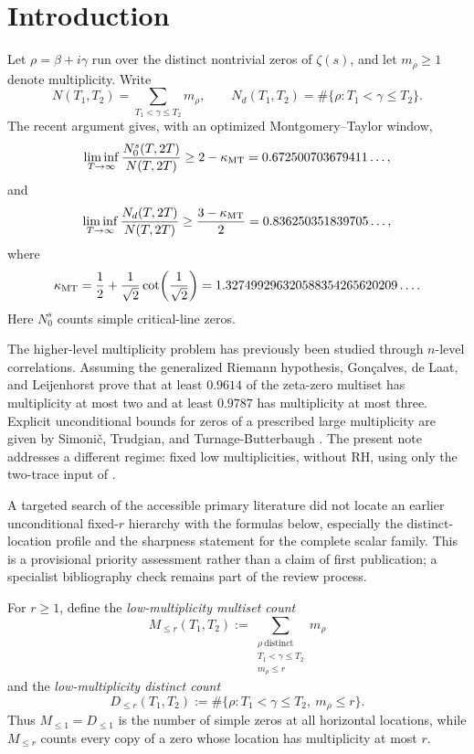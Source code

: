 \section{Introduction}

Let $\rho=\beta+i\gamma$ run over the distinct nontrivial zeros of $\zeta(s)$, and let $m_\rho\geq1$ denote multiplicity.  Write
\[
N(T_1,T_2)=\sum_{T_1<\gamma\leq T_2}m_\rho,
\qquad
N_d(T_1,T_2)=\#\{\rho:T_1<\gamma\leq T_2\}.
\]
The recent argument \cite{Claude2026} gives, with an optimized Montgomery--Taylor window,
\[
\liminf_{T\to\infty}\frac{N_0^s(T,2T)}{N(T,2T)}
\geq 2-\kappa_{\mathrm{MT}}
=0.672500703679411\ldots,
\]
and
\[
\liminf_{T\to\infty}\frac{N_d(T,2T)}{N(T,2T)}
\geq \frac{3-\kappa_{\mathrm{MT}}}{2}
=0.836250351839705\ldots,
\]
where
\begin{equation}\label{eq:kappa}
\kappa_{\mathrm{MT}}
=\frac{1}{2}+\frac{1}{\sqrt2}\cot\!\left(\frac{1}{\sqrt2}\right)
=1.327499296320588354265620209\ldots.
\end{equation}
Here $N_0^s$ counts simple critical-line zeros.

The higher-level multiplicity problem has previously been studied through $n$-level correlations.  Assuming the generalized Riemann hypothesis, Gon\c{c}alves, de Laat, and Leijenhorst \cite{GDL2025} prove that at least $0.9614$ of the zeta-zero multiset has multiplicity at most two and at least $0.9787$ has multiplicity at most three.  Explicit unconditional bounds for zeros of a prescribed large multiplicity are given by Simoni\v{c}, Trudgian, and Turnage-Butterbaugh \cite{STTB2022}.  The present note addresses a different regime: fixed low multiplicities, without RH, using only the two-trace input of \cite{Claude2026}.

A targeted search of the accessible primary literature did not locate an earlier unconditional fixed-$r$ hierarchy with the formulas below, especially the distinct-location profile and the sharpness statement for the complete scalar family.  This is a provisional priority assessment rather than a claim of first publication; a specialist bibliography check remains part of the review process.

For $r\geq1$, define the \emph{low-multiplicity multiset count}
\begin{equation}\label{eq:Mrdef}
M_{\leq r}(T_1,T_2)
:=\sum_{\substack{\rho\ \mathrm{distinct}\\T_1<\gamma\leq T_2\\m_\rho\leq r}}m_\rho
\end{equation}
and the \emph{low-multiplicity distinct count}
\begin{equation}\label{eq:Drdef}
D_{\leq r}(T_1,T_2)
:=\#\{\rho:T_1<\gamma\leq T_2,\ m_\rho\leq r\}.
\end{equation}
Thus $M_{\leq1}=D_{\leq1}$ is the number of simple zeros at all horizontal locations, while $M_{\leq r}$ counts every copy of a zero whose location has multiplicity at most $r$.

